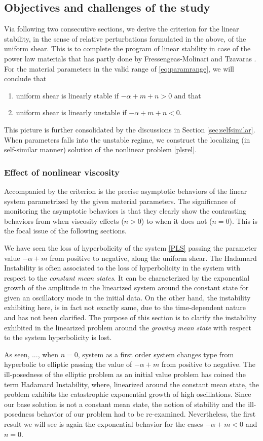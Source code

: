 \documentclass[a4paper,11pt]{article}
\def\blue{\color{blue}}
\theoremstyle{remark}
\begin{document}
\subsection{Objectives and challenges of the study}

Via following two consecutive sections, we derive the criterion for the linear stability, in the sense of relative perturbations formulated in the above, of the uniform shear. This is to complete the program of linear stability in case of the power law materials that has partly done by Fressengeas-Molinari \cite{FM87} and Tzavaras \cite{Tzavaras91} . For the material parameters in the valid range of \eqref{eq:paramrange}, we will conclude that
\begin{enumerate}
 \item uniform shear is linearly stable if $-\alpha+m+n>0$ and that
 \item uniform shear is linearly unstable if $-\alpha+m+n<0$.
\end{enumerate}
This picture is further consolidated by the discussions in Section  \ref{sec:selfsimilar}. When parameters falls into the unstable regime, we construct the localizing (in self-similar manner) solution of the nonlinear problem \eqref{plsrel}. 
\subsubsection{Effect of nonlinear viscosity}
Accompanied by the criterion is the precise asymptotic behaviors of the linear system parametrized by the given material parameters. The significance of monitoring the asymptotic behaviors is that they clearly show the contrasting behaviors from when viscosity effects ($n>0$) to when it does not ($n=0$). This is the focal issue of the following sections.
{\blue 
We have seen the loss of hyperbolicity of the system \eqref{PLS} passing the parameter value $-\alpha+m$ from positive to negative, along the uniform shear. The Hadamard Instability is often associated to the loss of hyperbolicity in the system with respect to the {\it constant mean states}. It can be characterized by the exponential growth of the amplitude in the linearized system around the constant state for given an oscillatory mode in the initial data. On the other hand, the instability exhibiting here, is in fact not exactly same, due to the time-dependent nature and has not been clarified. The purpose of this section is to clarify the instability exhibited in the linearized problem around the {\it growing mean state} with respect to the system hyperbolicity is lost.


As seen, ..., when $n=0$, system as a first order system changes type from hyperbolic to elliptic passing the value of $-\alpha+m$ from positive to negative. The ill-posedness of the elliptic problem as an initial value problem has coined the term Hadamard Instability, where, linearized around the constant mean state, the problem exhibits the catastrophic exponential growth of high oscillations. Since our base solution is not a constant mean state, the notion of stability and the ill-posedness behavior of our problem had to be re-examined. Nevertheless, the first result we will see is again the exponential behavior for the cases $-\alpha+m<0$ and $n=0$.}
\end{document}

